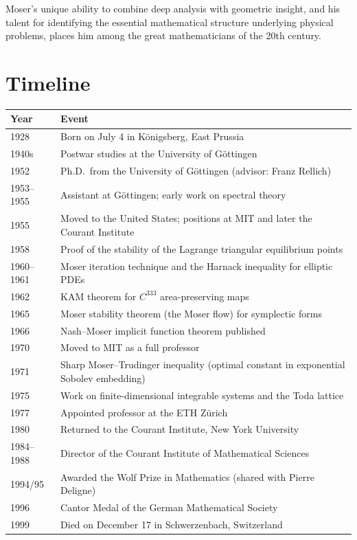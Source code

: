 Moser's unique ability to combine deep analysis with geometric insight, and his talent for identifying the essential mathematical structure underlying physical problems, places him among the great mathematicians of the 20th century.

\section*{Timeline}
\begin{tabularx}{\linewidth}{|p{1.5cm}|>{\raggedright\arraybackslash}X|}
\hline
\textbf{Year} & \textbf{Event} \\ \hline
1928 & Born on July 4 in K\"{o}nigsberg, East Prussia \\ \hline
1940s & Postwar studies at the University of G\"{o}ttingen \\ \hline
1952 & Ph.D.\ from the University of G\"{o}ttingen (advisor: Franz Rellich) \\ \hline
1953--1955 & Assistant at G\"{o}ttingen; early work on spectral theory \\ \hline
1955 & Moved to the United States; positions at MIT and later the Courant Institute \\ \hline
1958 & Proof of the stability of the Lagrange triangular equilibrium points \\ \hline
1960--1961 & Moser iteration technique and the Harnack inequality for elliptic PDEs \\ \hline
1962 & KAM theorem for $C^{333}$ area-preserving maps \\ \hline
1965 & Moser stability theorem (the Moser flow) for symplectic forms \\ \hline
1966 & Nash--Moser implicit function theorem published \\ \hline
1970 & Moved to MIT as a full professor \\ \hline
1971 & Sharp Moser--Trudinger inequality (optimal constant in exponential Sobolev embedding) \\ \hline
1975 & Work on finite-dimensional integrable systems and the Toda lattice \\ \hline
1977 & Appointed professor at the ETH Z\"{u}rich \\ \hline
1980 & Returned to the Courant Institute, New York University \\ \hline
1984--1988 & Director of the Courant Institute of Mathematical Sciences \\ \hline
1994/95 & Awarded the Wolf Prize in Mathematics (shared with Pierre Deligne) \\ \hline
1996 & Cantor Medal of the German Mathematical Society \\ \hline
1999 & Died on December 17 in Schwerzenbach, Switzerland \\ \hline
\end{tabularx}

